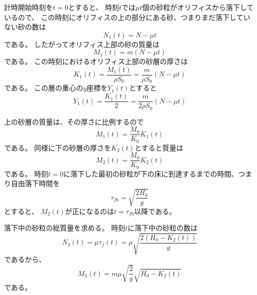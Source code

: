 \documentclass[]{article}
\begin{document}
計時開始時刻を$t=0$とすると、
時刻$t$では$\mu t$個の砂粒がオリフィスから落下しているので、
この時刻にオリフィスの上の部分にある砂、つまりまだ落下していない砂の数は
\begin{equation} \label{250703152453} 
   N_1(t) =  N - \mu t
\end{equation}
である。
したがってオリフィス上部の砂の質量は
\begin{equation} \label{250703152655} 
   M_1(t) = m (N-\mu t)
\end{equation}
である。
この時刻におけるオリフィス上部の砂層の厚さは
\begin{equation} \label{250703152748} 
   K_1(t) = \frac{M_1(t)}{\rho S_0} = \frac{m}{\rho S_0}(N-\mu t)
\end{equation}
である。
この層の重心の$y$座標を$Y_1(t)$とすると
\begin{equation} \label{250703153013} 
   Y_1(t) = \frac{K_1(t)}{2} = \frac{m}{2\rho S_0} ( N - \mu t)
\end{equation}



\color{blue}
上の砂層の質量は、その厚さに比例するので
\begin{equation} \label{250917175554} 
   M_1(t) = \frac{M_0}{K_0} K_1(t)
\end{equation}
である。
同様に下の砂層の厚さを$K_2(t)$とすると質量は
\begin{equation} \label{250917175633} 
   M_2(t) =  \frac{M_0}{K_0} K_2(t)
\end{equation}
である。
時刻$t=0$に落下した最初の砂粒が下の床に到達するまでの時間、つまり自由落下時間を
\begin{equation} \label{250703153227} 
   \tau_{f0} = \sqrt{\frac{2H_0}{g}}
\end{equation}
とすると、
$M_2(t)$が正になるのは$t=\tau_{f0}$以降である。


落下中の砂粒の総質量を求める。
時刻$t$に落下中の砂粒の数は
\begin{equation} \label{250917175724} 
   N_3(t) = \mu \tau_f(t) = \mu \sqrt{\frac{2(H_0-K_2(t))}{g}} 
\end{equation}
であるから、
\begin{equation} \label{250917175839} 
   M_3(t) = m \mu \sqrt{\frac{2}{g}} \sqrt{H_0-K_2(t)}
\end{equation}
である。
\end{document}
